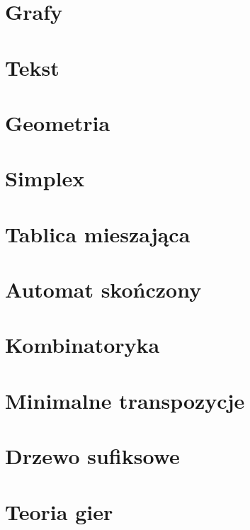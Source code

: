 \documentclass{article}
\begin{document}
\section{Grafy}


\newpage
\section{Tekst}


\newpage
\section{Geometria}


\newpage
\section{Simplex}

\newpage
\section{Tablica mieszająca}


\newpage
\section{Automat skończony}

\newpage
\section{Kombinatoryka}

\newpage
\section{Minimalne transpozycje}

\newpage
\section{Drzewo sufiksowe}

\newpage
\section{Teoria gier}


\end{document}
